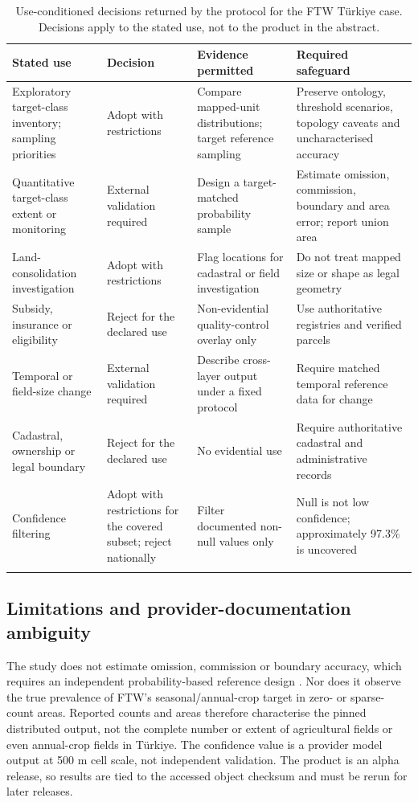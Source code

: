 \documentclass[pdflatex,sn-basic]{sn-jnl}
\begin{document}
\begin{table}[t]
\caption{Use-conditioned decisions returned by the protocol for the FTW Türkiye case. Decisions apply to the stated use, not to the product in the abstract.}\label{tab:applications}
\centering
\footnotesize
\begin{tabularx}{\textwidth}{@{}p{}p{}YY@{}}
\toprule
Stated use & Decision & Evidence permitted & Required safeguard \\
\midrule
Exploratory target-class inventory; sampling priorities & Adopt with restrictions & Compare mapped-unit distributions; target reference sampling & Preserve ontology, threshold scenarios, topology caveats and uncharacterised accuracy \\
Quantitative target-class extent or monitoring & External validation required & Design a target-matched probability sample & Estimate omission, commission, boundary and area error; report union area \\
Land-consolidation investigation & Adopt with restrictions & Flag locations for cadastral or field investigation & Do not treat mapped size or shape as legal geometry \\
Subsidy, insurance or eligibility & Reject for the declared use & Non-evidential quality-control overlay only & Use authoritative registries and verified parcels \\
Temporal or field-size change & External validation required & Describe cross-layer output under a fixed protocol & Require matched temporal reference data for change \\
Cadastral, ownership or legal boundary & Reject for the declared use & No evidential use & Require authoritative cadastral and administrative records \\
Confidence filtering & Adopt with restrictions for the covered subset; reject nationally & Filter documented non-null values only & Null is not low confidence; approximately 97.3\% is uncovered \\
\botrule
\end{tabularx}
\end{table}

\subsection{Limitations and provider-documentation ambiguity}\label{subsec:limitations}

The study does not estimate omission, commission or boundary accuracy, which requires an independent probability-based reference design \citep{olofsson_good_2014}. Nor does it observe the true prevalence of FTW's seasonal/annual-crop target in zero- or sparse-count areas. Reported counts and areas therefore characterise the pinned distributed output, not the complete number or extent of agricultural fields or even annual-crop fields in Türkiye. The confidence value is a provider model output at 500 m cell scale, not independent validation. The product is an alpha release, so results are tied to the accessed object checksum and must be rerun for later releases.
\end{document}
